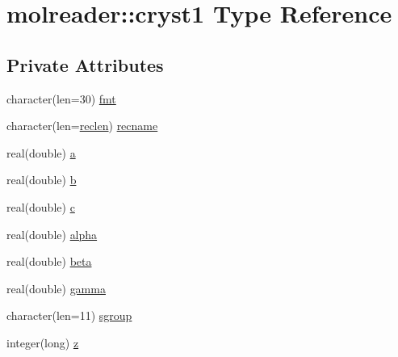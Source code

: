 \hypertarget{structmolreader_1_1cryst1}{\section{molreader\-:\-:cryst1 Type Reference}
\label{structmolreader_1_1cryst1}
}
\subsection*{Private Attributes}
\begin{DoxyCompactItemize}
\item 
character(len=30) \hyperlink{structmolreader_1_1cryst1_ab6ab864b10676c184026f298e2298135}{fmt}
\item 
character(len=\hyperlink{classmolreader_a8f12be3272b946fd698c9fbaf2ba9d32}{reclen}) \hyperlink{structmolreader_1_1cryst1_ae85e046760ae97562351b100fd2c9034}{recname}
\item 
real(double) \hyperlink{structmolreader_1_1cryst1_a85327bed083d1034112fc1bc78efd7e0}{a}
\item 
real(double) \hyperlink{structmolreader_1_1cryst1_a0cedac0856256f960f563ea0e3d57945}{b}
\item 
real(double) \hyperlink{structmolreader_1_1cryst1_a6269ff5021092d6d0b0185cda1572489}{c}
\item 
real(double) \hyperlink{structmolreader_1_1cryst1_a6186be5cb316849fcb7cfca0ec9c6358}{alpha}
\item 
real(double) \hyperlink{structmolreader_1_1cryst1_a0c69e8f33d0711ee345d6bfc3212e671}{beta}
\item 
real(double) \hyperlink{structmolreader_1_1cryst1_a5830f0c34f6ad1c07482a203f7a7b175}{gamma}
\item 
character(len=11) \hyperlink{structmolreader_1_1cryst1_a689985667a15167b26dee5b87a240333}{sgroup}
\item 
integer(long) \hyperlink{structmolreader_1_1cryst1_ae973dda59fd038efc49c8a247e3e71c9}{z}
\end{DoxyCompactItemize}


